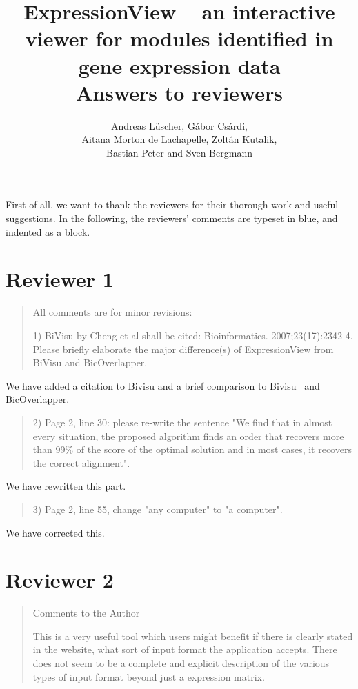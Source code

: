 \documentclass[a4paper]{article}
\title{ExpressionView -- an interactive viewer for
  modules identified in gene expression data\\[10pt]
  Answers to reviewers}
\author{Andreas L\"uscher, G\'abor Cs\'ardi, \\ Aitana Morton de
  Lachapelle, Zolt\'an Kutalik, \\ Bastian Peter and Sven Bergmann}
\newenvironment{myquote}{\begin{quote}\color{blue}}{\end{quote}}
\begin{document}
\maketitle

\RaggedRight

First of all, we want to thank the reviewers for their thorough work
and useful suggestions. In the following, the reviewers' comments are
typeset in blue, and indented as a block.

\section*{Reviewer 1}

\begin{myquote}
All comments are for minor revisions:

1) BiVisu by Cheng et al shall be cited:
Bioinformatics. 2007;23(17):2342-4. Please briefly elaborate the major
difference(s) of ExpressionView from BiVisu and BicOverlapper.
\end{myquote}

We have added a citation to Bivisu and a brief comparison to
Bivisu~\citep{cheng07} and BicOverlapper\citep{santamaria08}. 

\begin{myquote}
2) Page 2, line 30: please re-write the sentence "We find that in
almost every situation, the proposed algorithm finds an order that
recovers more than 99\% of the score of the optimal solution and in
most cases, it recovers the correct alignment". 
\end{myquote}

We have rewritten this part.

\begin{myquote}
3) Page 2, line 55, change "any computer" to "a computer".
\end{myquote}

We have corrected this.

\section*{Reviewer 2}

\begin{myquote}
Comments to the Author

This is a very useful tool which users might  benefit if there is
clearly stated in the website, what sort of input format the
application accepts. There does not seem to be a complete and explicit
description of the various types of input format beyond just a
expression matrix.
\end{myquote}
\end{document}
